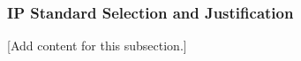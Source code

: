 
\subsubsection{IP Standard Selection and Justification}
\label{subsubsec:design_10_1_ip_standard_selection}

[Add content for this subsection.]

